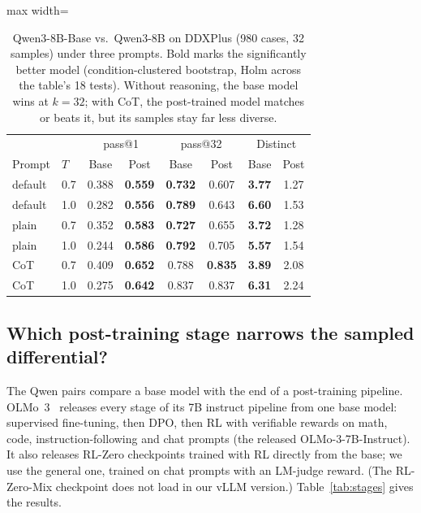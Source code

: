 \documentclass[11pt]{article}
\begin{document}
\begin{table}[t]
\centering\small
\begin{adjustbox}{max width=\linewidth}
\begin{tabular}{llcccccc}
\toprule
 & & \multicolumn{2}{c}{pass@1} & \multicolumn{2}{c}{pass@32} & \multicolumn{2}{c}{Distinct} \\
Prompt & $T$ & Base & Post & Base & Post & Base & Post \\
\midrule
default & 0.7 & 0.388 & \textbf{0.559} & \textbf{0.732} & 0.607 & \textbf{3.77} & 1.27 \\
default & 1.0 & 0.282 & \textbf{0.556} & \textbf{0.789} & 0.643 & \textbf{6.60} & 1.53 \\
plain & 0.7 & 0.352 & \textbf{0.583} & \textbf{0.727} & 0.655 & \textbf{3.72} & 1.28 \\
plain & 1.0 & 0.244 & \textbf{0.586} & \textbf{0.792} & 0.705 & \textbf{5.57} & 1.54 \\
CoT & 0.7 & 0.409 & \textbf{0.652} & 0.788 & \textbf{0.835} & \textbf{3.89} & 2.08 \\
CoT & 1.0 & 0.275 & \textbf{0.642} & 0.837 & 0.837 & \textbf{6.31} & 2.24 \\
\bottomrule
\end{tabular}
\end{adjustbox}
\caption{Qwen3-8B-Base vs.\ Qwen3-8B on DDXPlus (980 cases, 32 samples) under three prompts. Bold marks the significantly better model (condition-clustered bootstrap, Holm across the table's 18 tests). Without reasoning, the base model wins at $k{=}32$; with CoT, the post-trained model matches or beats it, but its samples stay far less diverse.}
\label{tab:prompts}
\end{table}

\subsection{Which post-training stage narrows the sampled differential?}\label{sec:stages}
The Qwen pairs compare a base model with the end of a post-training pipeline. OLMo~3~\citep{olmo2025olmo3} releases every stage of its 7B instruct pipeline from one base model: supervised fine-tuning, then DPO, then RL with verifiable rewards on math, code, instruction-following and chat prompts (the released OLMo-3-7B-Instruct). It also releases RL-Zero checkpoints trained with RL directly from the base; we use the general one, trained on chat prompts with an LM-judge reward. (The RL-Zero-Mix checkpoint does not load in our vLLM version.) Table~\ref{tab:stages} gives the results.
\end{document}
